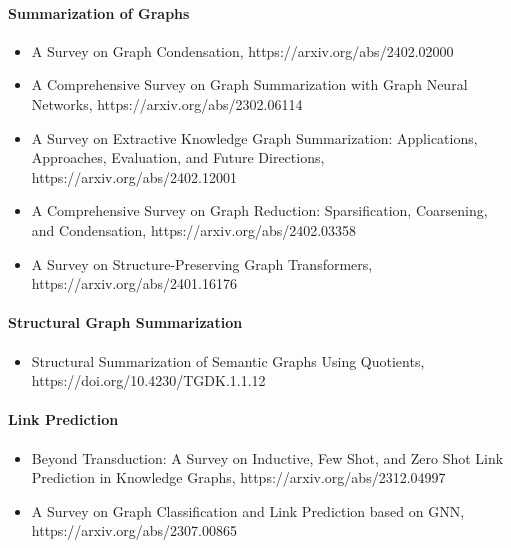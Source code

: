 \paragraph{Summarization of Graphs}

\begin{itemize}
\item A Survey on Graph Condensation, https://arxiv.org/abs/2402.02000

\item A Comprehensive Survey on Graph Summarization with Graph Neural Networks, https://arxiv.org/abs/2302.06114

\item A Survey on Extractive Knowledge Graph Summarization: Applications, Approaches, Evaluation, and Future Directions, https://arxiv.org/abs/2402.12001

\item A Comprehensive Survey on Graph Reduction: Sparsification, Coarsening, and Condensation, https://arxiv.org/abs/2402.03358

\item A Survey on Structure-Preserving Graph Transformers, https://arxiv.org/abs/2401.16176
\end{itemize}


\paragraph{Structural Graph Summarization}

\begin{itemize}
\item Structural Summarization of Semantic Graphs Using Quotients, https://doi.org/10.4230/TGDK.1.1.12
\end{itemize}
 
\paragraph{Link Prediction}

\begin{itemize}
\item Beyond Transduction: A Survey on Inductive, Few Shot, and Zero Shot Link Prediction in Knowledge Graphs, https://arxiv.org/abs/2312.04997

\item A Survey on Graph Classification and Link Prediction based on GNN, https://arxiv.org/abs/2307.00865
\end{itemize}

